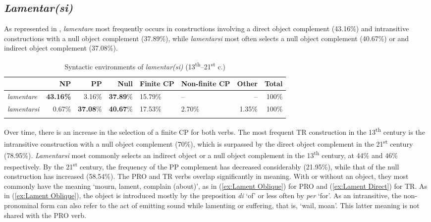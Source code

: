 \documentclass[output=paper,colorlinks,citecolor=brown]{langscibook}
\begin{document}
\subsection{\textit{Lamentar(si)}}

As represented in , \textit{lamentare} most frequently occurs in constructions involving a direct object complement (43.16\%) and intransitive constructions with a null object complement (37.89\%), while \textit{lamentarsi} most often selects a null object complement (40.67\%) or and indirect object complement (37.08\%).

\begin{table}
\caption{Syntactic environments of \textit{lamentar(si)} (13\textsuperscript{th}--21\textsuperscript{st} c.)}
\label{tab:1:lament}
\small
 \begin{tabularx}{\textwidth}{lrrrYYrr}
  \lsptoprule
            & NP & PP & Null & Finite CP & Non-finite CP & Other & Total \\
  \midrule
  \textit{lamentare}  &  \textbf{43.16\%}   &    3.16\%  &    \textbf{37.89}\%      & 15.79\%  &   -- & -- & 100\%\\
  \textit{lamentarsi}  &   0.67\% &   \textbf{37.08}\%  &    \textbf{40.67}\%     & 17.53\% &   2.70\% & 1.35\% & 100\%\\
  \lspbottomrule
 \end{tabularx}
\end{table}

Over time, there is an increase in the selection of a finite CP for both verbs. The most frequent TR construction in the 13\textsuperscript{th} century is the intransitive construction with a null object complement (70\%), which is surpassed by the direct object complement in the 21\textsuperscript{st} century (78.95\%). \textit{Lamentarsi} most commonly selects an indirect object or a null object complement in the 13\textsuperscript{th} century, at 44\% and 46\% respectively. By the 21\textsuperscript{st} century, the frequency of the PP complement has decreased considerably (21.95\%), while that of the null construction has increased (58.54\%).
The PRO and TR verbs overlap significantly in meaning. With or without an object, they most commonly have the meaning ‘mourn, lament, complain (about)’, as in (\ref{ex:Lament Oblique}) for PRO and (\ref{ex:Lament Direct}) for TR. As in (\ref{ex:Lament Oblique}), the object is introduced mostly by the preposition \textit{di} ‘of’ or less often by \textit{per} ‘for’. As an intransitive, the non-pronominal form can also refer to the act of emitting sound while lamenting or suffering, that is, ‘wail, moan’. This latter meaning is not shared with the PRO verb.
\end{document}
